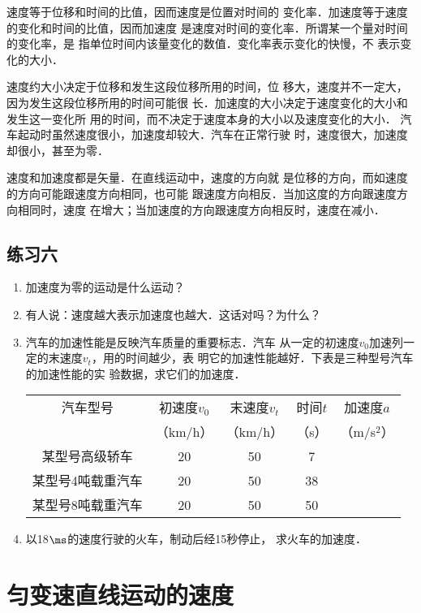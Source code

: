     速度等于位移和时间的比值，因而速度是位置对时间的
变化率．加速度等于速度的变化和时间的比值，因而加速度
是速度对时间的变化率．所谓某一个量对时间的变化率，是
指单位时间内该量变化的数值．变化率表示变化的快慢，不
表示变化的大小．

    速度约大小决定于位移和发生这段位移所用的时间，位
移大，速度并不一定大，因为发生这段位移所用的时间可能很
长．加速度的大小决定于速度变化的大小和发生这一变化所
用的时间，而不决定于速度本身的大小以及速度变化的大小．
汽车起动时虽然速度很小，加速度却较大．汽车在正常行驶
时，速度很大，加速度却很小，甚至为零．

    速度和加速度都是矢量．在直线运动中，速度的方向就
是位移的方向，而如速度的方向可能跟速度方向相同，也可能
跟速度方向相反．当加这度的方向跟速度方向相同时，速度
在增大；当加速度的方向跟速度方向相反时，速度在减小．

\subsection*{练习六}
\begin{enumerate}
\item  加速度为零的运动是什么运动？
\item  有人说：速度越大表示加速度也越大．这话对吗？为什么？
\item  汽车的加速性能是反映汽车质量的重要标志．汽车
从一定的初速度$v_0$加速列一定的末速度$v_t$，用的时间越少，表
明它的加速性能越好．下表是三种型号汽车的加速性能的实
验数据，求它们的加速度．

\begin{center}
\begin{tabular}{ccccc}
\hline
汽车型号 & 初速度$v_0$ & 末速度$v_t$ & 时间$t$ & 加速度$a$\\
& （km/h）& （km/h）& （s）& （m/s$^2$）\\
\hline
某型号高级轿车& 20& 50& 7 \\
某型号4吨载重汽车& 20& 50& 38\\
某型号8吨载重汽车& 20& 50& 50\\
\hline
\end{tabular}
\end{center}

\item   以18$\ms$的速度行驶的火车，制动后经15秒停止，
求火车的加速度．

\end{enumerate}

\section{匀变速直线运动的速度}
